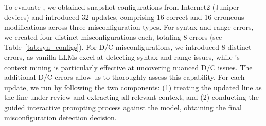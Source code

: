  
To evaluate \sysname{}, we obtained snapshot configurations from Internet2 (Juniper devices) and introduced 32 updates, comprising 16 correct  and 16 erroneous modifications across three misconfiguration types. 
For syntax and range errors, we created four distinct misconfigurations each, totaling 8 errors (see Table~\ref{tab:syn_configs}). For D/C misconfigurations, we introduced 8 distinct errors, as vanilla LLMs excel at detecting syntax and range issues, while \sysname{}’s context mining is particularly effective at uncovering nuanced D/C issues. The additional D/C errors allow us to thoroughly assess this capability.
For each update, we run \sysname{} by following the two components: (1) treating the updated line as the line under review and extracting all relevant context, and (2) conducting the guided interactive prompting process against the model, obtaining the final misconfiguration detection decision.


